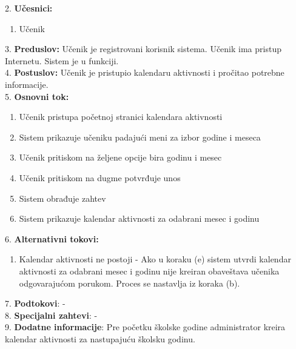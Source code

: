 \documentclass{article}
\begin{document}
2. \textbf{Učesnici:}
\begin{enumerate} [label=(\alph*)]
\item Učenik
\end{enumerate} 

3. \textbf{Preduslov:} Učenik je registrovani korisnik sistema. Učenik ima pristup Internetu. Sistem je u funkciji. \\

4. \textbf{Postuslov:} Učenik je pristupio kalendaru aktivnosti i pročitao potrebne informacije. \\

5. \textbf{Osnovni tok:} 
\begin{enumerate} [label=(\alph*)]
\item Učenik pristupa početnoj stranici kalendara aktivnosti
\item Sistem prikazuje učeniku padajući meni za izbor godine i meseca
\item Učenik pritiskom na željene opcije bira godinu i mesec
\item Učenik pritiskom na dugme potvrđuje unos 
\item Sistem obrađuje zahtev
\item Sistem prikazuje kalendar aktivnosti za odabrani mesec i godinu
\end{enumerate}


6. \textbf{Alternativni tokovi:}
\begin{enumerate} [label=(\roman*)]
\item Kalendar aktivnosti ne postoji - Ako u koraku (e) sistem utvrdi kalendar aktivnosti za odabrani mesec i godinu nije kreiran obaveštava učenika odgovarajućom porukom. Proces se nastavlja iz koraka (b).
\end{enumerate}

7. \textbf{Podtokovi}: - \\

8. \textbf{Specijalni zahtevi}: - \\

9. \textbf{Dodatne informacije}: Pre početku školske godine administrator kreira kalendar aktivnosti za nastupajuću školsku godinu. \\
\end{document}

